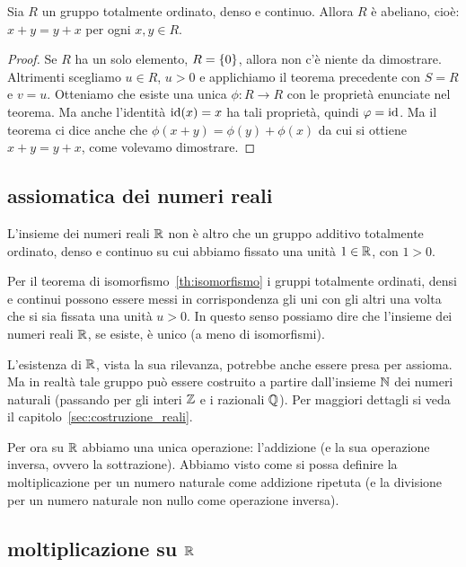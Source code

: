 \begin{theorem}[commutatività]
  Sia $R$ un gruppo totalmente ordinato, denso e continuo. 
  Allora $R$ è abeliano, cioè: $x+y=y+x$ per ogni $x,y\in R$.
\end{theorem}
%
\begin{proof}
Se $R$ ha un solo elemento, $R={\left\{ 0 \right\}}$, allora non c'è niente da dimostrare.
Altrimenti scegliamo $u\in R$, $u>0$ e applichiamo il teorema precedente 
con $S=R$ e $v=u$. 
Otteniamo che esiste una unica $\phi\colon R\to R$ con le proprietà 
enunciate nel teorema. 
Ma anche l'identità $\mathrm{id}(x)=x$ ha tali proprietà, quindi $\varphi =\mathrm{id}$.
Ma il teorema ci dice anche che $\phi(x+y) = \phi(y)+\phi(x)$ da cui si ottiene
$x+y=y+x$, come volevamo dimostrare.
\end{proof}

\subsection{assiomatica dei numeri reali}

L'insieme dei numeri reali ${\mathbb R}$ non è altro che un gruppo additivo 
totalmente ordinato, denso e continuo su cui abbiamo fissato una unità 
$1\in {\mathbb R}$, con $1>0$.

Per il teorema di isomorfismo~\ref{th:isomorfismo}
i gruppi totalmente ordinati, densi e continui 
possono essere messi in corrispondenza gli uni con gli altri 
una volta che si sia fissata una unità $u>0$. 
In questo senso possiamo dire che l'insieme dei numeri reali 
${\mathbb R}$, se esiste, è unico (a meno di isomorfismi).

L'esistenza di ${\mathbb R}$, vista la sua rilevanza, potrebbe anche essere presa 
per assioma. 
Ma in realtà tale gruppo può essere costruito a partire dall'insieme ${\mathbb N}$ 
dei numeri naturali (passando per gli interi ${\mathbb Z}$ e i razionali ${\mathbb Q}$). 
Per maggiori dettagli si veda il capitolo~\ref{sec:costruzione_reali}.

Per ora su ${\mathbb R}$ abbiamo una unica operazione: l'addizione 
(e la sua operazione inversa, ovvero la sottrazione).
Abbiamo visto come si possa definire la moltiplicazione per un numero naturale 
come addizione ripetuta (e la divisione per un numero naturale non nullo 
come operazione inversa). 

\subsection{moltiplicazione su ${\mathbb R}$}

